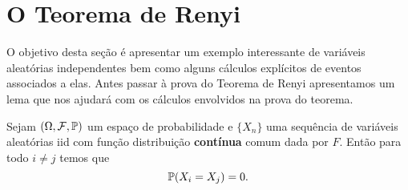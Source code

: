 \section{O Teorema de Renyi}\label{sec-teo-Renyi}

O objetivo desta seção é apresentar um exemplo 
interessante de variáveis aleatórias independentes
bem como alguns cálculos explícitos de eventos 
associados a elas. Antes passar à prova do 
Teorema de Renyi apresentamos um lema que 
nos ajudará com os cálculos envolvidos na 
prova do teorema.

\begin{lema}
Sejam $(\Omega,\F,\P)$ um espaço de probabilidade e 
$\{X_n\}$ uma sequência de variáveis aleatórias
iid com função distribuição {\bf contínua} comum 
dada por $F$. Então para todo $i\neq j$ temos que
	\[
		\P(X_i=X_j)=0.
	\]
\end{lema}


